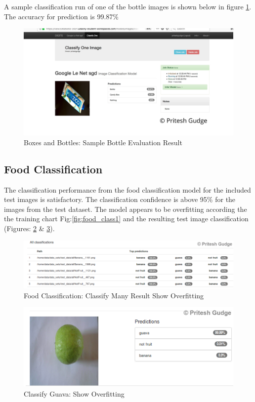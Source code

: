 \documentclass[10pt,journal,compsoc]{IEEEtran}
\begin{document}
A sample classification run of one of the bottle images is shown below in figure \ref{fig:bottle_classify}. The accuracy for prediction is 99.87\%


\begin{figure}[thpb]
      \centering
      \includegraphics[width=\linewidth]{images/7_sgd_bottle}
      \caption{Boxes and Bottles: Sample Bottle Evaluation Result}
      \label{fig:bottle_classify}
\end{figure}

\subsection{Food Classification}
The classification performance from the food classification model for the included test images is satisfactory. The classification confidence is above 95\% for the images from the test dataset. The model appears to be overfitting according the the training chart Fig:\ref{fig:food_class1} and the resulting test image classification (Figures: \ref{fig:classify_many} \& \ref{fig:classify_guava}).

\begin{figure}[thpb]
      \centering
      \includegraphics[width=\linewidth]{images/classify_many_2}
      \caption{Food Classification: Classify Many Result Show Overfitting}
      \label{fig:classify_many}
\end{figure}

\begin{figure}[thpb]
      \centering
      \includegraphics[width=\linewidth]{images/classify_guava_2}
      \caption{Classify Guava: Show Overfitting}
      \label{fig:classify_guava}
\end{figure}
\end{document}
